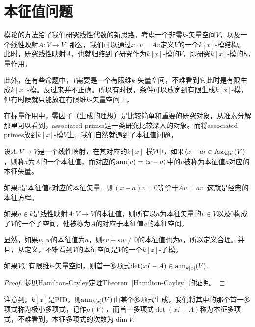 \section{本征值问题}

模论的方法给了我们研究线性代数的新思路。考虑一个非零$k$-矢量空间$V$，以及一个线性映射$A:V\to V$. 那么，我们可以通过$x\cdot v=Av$定义$V$的一个$k[x]$-模结构。此时，研究线性映射$A$，也就归结到了研究作为$k[x]$-模的$V$，即研究$k[x]$-模的标量作用。

此外，在有些命题中，$V$需要是一个有限维$k$-矢量空间，不难看到它此时是有限生成$k[x]$-模。反过来并不正确。所以有时候，条件可以放宽到有限生成$k[x]$-模，但有时候就只能放在有限维$k$-矢量空间上。

在标量作用中，零因子（生成的理想）是比较简单和重要的研究对象，从准素分解那里可以看到，associated primes是一类研究比较深入的对象。而将associated primes放到$k[x]$-模$V$上，我们自然就遇到了本征值问题。

\begin{para}[本征值与本征矢量]
    设$A:V\to V$是一个线性映射，在其对应的$k[x]$-模$V$中，如果$\langle x-a\rangle\in \operatorname{Ass}_{k[x]}(V)$，则称$a$为$A$的一个本征值，而对应的$\operatorname{ann}(v)=\langle x-a\rangle$中的$v$被称为本征值$a$对应的本征矢量。
\end{para}

如果$v$是本征值$a$对应的本征矢量，则$(x-a)v=0$等价于$Av=av$. 这就是经典的本征方程。

\begin{para}[本征空间]
    如果$a\in k$是线性映射$A:V\to V$的本征值，则所有以$a$为本征矢量的$v\in V$以及$0$构成了$V$的一个子空间，他被称为$A$的对应于本征值$a$的本征空间。

    显然，如果$v$, $w$的本征值为$a$，则$rv+sw\neq 0$的本征值也为$a$，所以定义合理。并且，从定义，不难看到$V$的本征空间是$V$的一个$k[x]$-子模。
\end{para}

\begin{lem}
    如果$V$是有限维$k$-矢量空间，则首一多项式$\det(xI-A)\in \operatorname{ann}_{k[x]}(V)$.
\end{lem}

\begin{proof}
    参见Hamilton-Cayley定理Theorem \ref{Hamilton-Cayley} 的证明。
\end{proof}

注意到，$k[x]$是PID，则$\operatorname{ann}_{k[x]}(V)$由某个多项式生成，我们将其中的那个首一多项式称为极小多项式，记作$p(V)$，而首一多项式$\det(xI-A)$称为本征多项式，不难看到，本征多项式的次数为$\dim V$.

